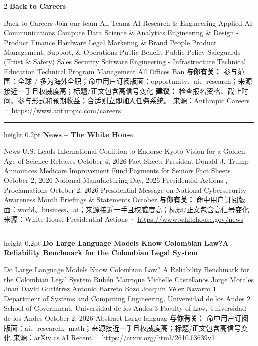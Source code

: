 \documentclass[10.5pt]{ctexart}
\begin{document}
\begin{multicols}{2}
{\large\bfseries Back to Careers}\par
Back to Careers Join our team All Teams AI Research \& Engineering Applied AI Communications Compute Data Science \& Analytics Engineering \& Design - Product Finance Hardware Legal Marketing \& Brand People Product Management, Support, \& Operations Public Benefit Public Policy Safeguards (Trust \& Safety) Sales Security Software Engineering - Infrastructure Technical Education Technical Program Management All Offices Ban
\textbf{与你有关：} 参与范围：全球 / 多为海外全职；命中用户订阅版面：opportunity、ai、research；来源接近一手且权威度高；标题/正文包含高信号变化
\textbf{建议：} 检查报名资格、截止时间、参与形式和预期收益；合适则立即加入任务系统。
{\footnotesize\color{ormuted} 来源：Anthropic Careers · \url{https://www.anthropic.com/careers}}
\vspace{2mm}
\hrule height 0.2pt
\vspace{2mm}
{\large\bfseries News – The White House}\par
News U.S. Leads International Coalition to Endorse Kyoto Vision for a Golden Age of Science Releases October 4, 2026 Fact Sheet: President Donald J. Trump Announces Medicare Improvement Fund Payments for Seniors Fact Sheets October 2, 2026 National Manufacturing Day, 2026 Presidential Actions , Proclamations October 2, 2026 Presidential Message on National Cybersecurity Awareness Month Briefings \& Statements October 
\textbf{与你有关：} 命中用户订阅版面：world、business、ai；来源接近一手且权威度高；标题/正文包含高信号变化
{\footnotesize\color{ormuted} 来源：White House Presidential Actions · \url{https://www.whitehouse.gov/news}}
\vspace{2mm}
\hrule height 0.2pt
\vspace{2mm}
{\large\bfseries Do Large Language Models Know Colombian Law?A Reliability Benchmark for the Colombian Legal System}\par
Do Large Language Models Know Colombian Law? A Reliability Benchmark for the Colombian Legal System Rubén Manrique Michelle Castellanos Jorge Morales Juan David Gutiérrez Antonio Barreto Rozo Joaquín Vélez Navarro 1 Department of Systems and Computing Engineering, Universidad de los Andes 2 School of Government, Universidad de los Andes 3 Faculty of Law, Universidad de los Andes October 2, 2026 Abstract Large languag
\textbf{与你有关：} 命中用户订阅版面：ai、research、math；来源接近一手且权威度高；标题/正文包含高信号变化
{\footnotesize\color{ormuted} 来源：arXiv cs.AI Recent · \url{https://arxiv.org/html/2610.03639v1}}

\end{multicols}
\end{document}
